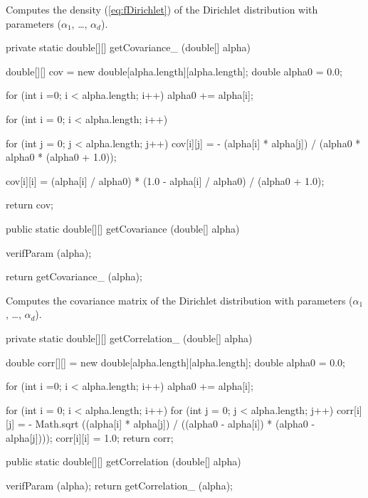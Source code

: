 \begin{tabb}
   Computes the density (\ref{eq:fDirichlet}) of the Dirichlet distribution
   with parameters ($\alpha_1$, \ldots, $\alpha_d$).
\end{tabb}
\begin{code}\begin{hide}

   private static double[][] getCovariance_ (double[] alpha) {
      double[][] cov = new double[alpha.length][alpha.length];
      double alpha0 = 0.0;

      for (int i =0; i < alpha.length; i++)
         alpha0 += alpha[i];

      for (int i = 0; i < alpha.length; i++) {
         for (int j = 0; j < alpha.length; j++)
            cov[i][j] = - (alpha[i] * alpha[j]) / (alpha0 * alpha0 * (alpha0 + 1.0));

         cov[i][i] = (alpha[i] / alpha0) * (1.0 - alpha[i] / alpha0) / (alpha0 + 1.0);
      }

      return cov;
   }\end{hide}

   public static double[][] getCovariance (double[] alpha)\begin{hide} {
      verifParam (alpha);

      return getCovariance_ (alpha);
   }\end{hide}
\end{code}
\begin{tabb}
   Computes the covariance matrix of the Dirichlet distribution
   with parameters ($\alpha_1$, \ldots, $\alpha_d$).
\end{tabb}
\begin{code}\begin{hide}

   private static double[][] getCorrelation_ (double[] alpha) {
      double corr[][] = new double[alpha.length][alpha.length];
      double alpha0 = 0.0;

      for (int i =0; i < alpha.length; i++)
         alpha0 += alpha[i];

      for (int i = 0; i < alpha.length; i++) {
         for (int j = 0; j < alpha.length; j++)
            corr[i][j] = - Math.sqrt ((alpha[i] * alpha[j]) /
                                      ((alpha0 - alpha[i]) * (alpha0 - alpha[j])));
         corr[i][i] = 1.0;
      }
      return corr;
   }\end{hide}

   public static double[][] getCorrelation (double[] alpha)\begin{hide} {
      verifParam (alpha);
      return getCorrelation_ (alpha);
   }\end{hide}
\end{code}
